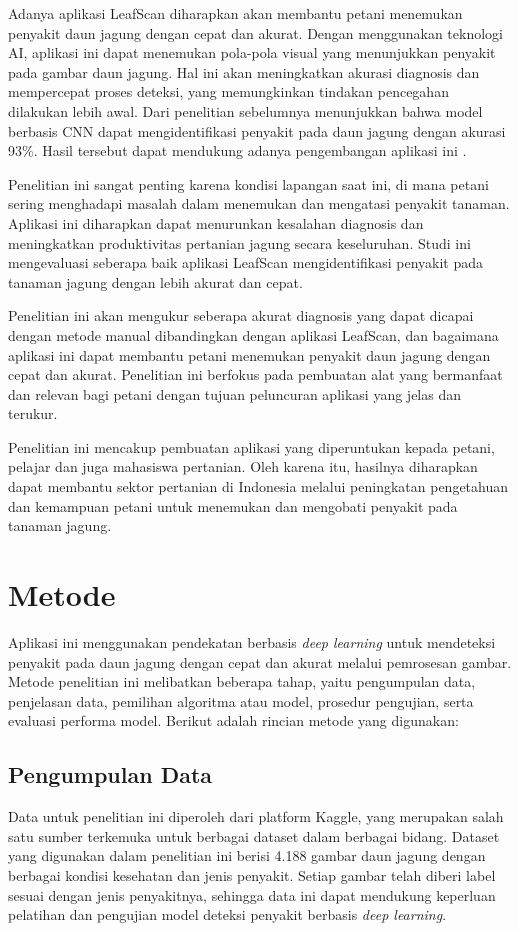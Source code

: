 \documentclass[journal,article,submit,pdftex,moreauthors]{Definitions/mdpi}
\begin{document}
Adanya aplikasi LeafScan diharapkan akan membantu petani menemukan penyakit daun jagung dengan cepat dan akurat. Dengan menggunakan teknologi AI, aplikasi ini dapat menemukan pola-pola visual yang menunjukkan penyakit pada gambar daun jagung. Hal ini akan meningkatkan akurasi diagnosis dan mempercepat proses deteksi, yang memungkinkan tindakan pencegahan dilakukan lebih awal. Dari penelitian sebelumnya menunjukkan bahwa model berbasis CNN dapat mengidentifikasi penyakit pada daun jagung dengan akurasi 93\%. Hasil tersebut dapat mendukung adanya pengembangan aplikasi ini \cite{Putra2023}.

Penelitian ini sangat penting karena kondisi lapangan saat ini, di mana petani sering menghadapi masalah dalam menemukan dan mengatasi penyakit tanaman. Aplikasi ini diharapkan dapat menurunkan kesalahan diagnosis dan meningkatkan produktivitas pertanian jagung secara keseluruhan. Studi ini mengevaluasi seberapa baik aplikasi LeafScan mengidentifikasi penyakit pada tanaman jagung dengan lebih akurat dan cepat.

Penelitian ini akan mengukur seberapa akurat diagnosis yang dapat dicapai dengan metode manual dibandingkan dengan aplikasi LeafScan, dan bagaimana aplikasi ini dapat membantu petani menemukan penyakit daun jagung dengan cepat dan akurat. Penelitian ini berfokus pada pembuatan alat yang bermanfaat dan relevan bagi petani dengan tujuan peluncuran aplikasi yang jelas dan terukur.

Penelitian ini mencakup pembuatan aplikasi yang diperuntukan kepada petani, pelajar dan juga mahasiswa pertanian. Oleh karena itu, hasilnya diharapkan dapat membantu sektor pertanian di Indonesia melalui peningkatan pengetahuan dan kemampuan petani untuk menemukan dan mengobati penyakit pada tanaman jagung.
\section{Metode}

Aplikasi ini menggunakan pendekatan berbasis \textit{deep learning} untuk mendeteksi penyakit pada daun jagung dengan cepat dan akurat melalui pemrosesan gambar. Metode penelitian ini melibatkan beberapa tahap, yaitu pengumpulan data, penjelasan data, pemilihan algoritma atau model, prosedur pengujian, serta evaluasi performa model. Berikut adalah rincian metode yang digunakan:

\subsection{Pengumpulan Data}  
Data untuk penelitian ini diperoleh dari platform Kaggle, yang merupakan salah satu sumber terkemuka untuk berbagai dataset dalam berbagai bidang. Dataset yang digunakan dalam penelitian ini berisi 4.188 gambar daun jagung dengan berbagai kondisi kesehatan dan jenis penyakit. Setiap gambar telah diberi label sesuai dengan jenis penyakitnya, sehingga data ini dapat mendukung keperluan pelatihan dan pengujian model deteksi penyakit berbasis \textit{deep learning}.
\end{document}
